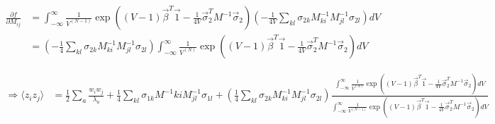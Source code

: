 \documentclass{article}
\begin{document}
\begin{align*}
\frac{\partial f}{\partial M_{ij}}&=\int_{-\infty}^\infty\frac{1}{V^{(N-1)}}\exp\left((V-1)\vec{\beta}^T\vec{1}-\frac{1}{4V}\vec{\sigma}_2^TM^{-1}\vec{\sigma}_2\right)\left(-\frac{1}{4V}\sum_{kl}\sigma_{2k}M^{-1}_{ki}M^{-1}_{jl}\sigma_{2l}\right)dV
\\&=\left(-\frac{1}{4}\sum_{kl}\sigma_{2k}M^{-1}_{ki}M^{-1}_{jl}\sigma_{2l}\right)\int_{-\infty}^\infty\frac{1}{V^{(N)}}\exp\left((V-1)\vec{\beta}^T\vec{1}-\frac{1}{4V}\vec{\sigma}_2^TM^{-1}\vec{\sigma}_2\right)dV
\end{align*}

\begin{align*}
\Rightarrow \langle z_iz_j\rangle &=\frac{1}{2}\sum_a\frac{w_iw_j}{\lambda_a}+\frac{1}{4}\sum_{kl}\sigma_{1k}M^{-1}{ki}M^{-1}_{jl}\sigma_{1l}+\left(\frac{1}{4}\sum_{kl}\sigma_{2k}M^{-1}_{ki}M^{-1}_{jl}\sigma_{2l}\right)\frac{\int_{-\infty}^\infty\frac{1}{V^{(N)}}\exp\left((V-1)\vec{\beta}^T\vec{1}-\frac{1}{4V}\vec{\sigma}_2^TM^{-1}\vec{\sigma}_2\right)dV}{\int_{-\infty}^\infty\frac{1}{V^{(N-1)}}\exp\left((V-1)\vec{\beta}^T\vec{1}-\frac{1}{4V}\vec{\sigma}_2^TM^{-1}\vec{\sigma}_2\right)dV}
\end{align*}

\nocite{*}


\end{document}
